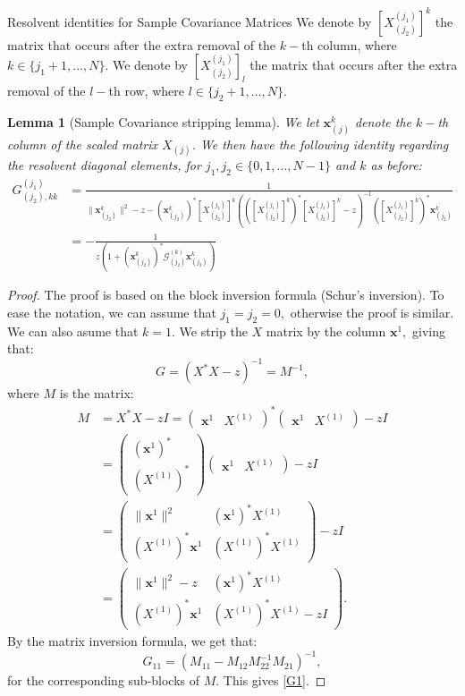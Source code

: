 \documentclass[11pt, a4paper, oneside]{book}
\numberwithin{equation}{chapter}
\newcommand{\x}{\mathbf{x}}
\newtheorem{lem}[thm]{Lemma}
\begin{document}
\begin{section}{Resolvent identities for Sample Covariance Matrices}
We denote by $[X_{(j_2)}^{(j_1)}]^k$ the matrix that occurs after the extra removal of the $k-$th column, where $k \in \{j_1+1,...,N\}.$ We denote by $[X_{(j_2)}^{(j_1)}]_l$ the matrix that occurs after the extra removal of the $l-$th row, where $l \in \{j_2+1,...,N\}.$
%
\begin{lem}[Sample Covariance stripping lemma] We let $\mathbf{x}_{(j)}^k$ denote the $k-$th column of the scaled matrix $X_{(j)}$. We then have the following identity regarding the resolvent diagonal elements, for $j_1,j_2 \in \{0,1,...,N-1\}$ and $k$ as before:
    \begin{align}
G_{(j_2), kk}^{(j_1)} &= \frac{1}{\| \x_{(j_2)}^k \|^2 - z - (\x_{(j_2)}^k)^*[X_{(j_2)}^{(j_1)}]^k\left(([X_{(j_2)}^{(j_1)}]^k)^*[X_{(j_2)}^{(j_1)}]^k - z \right)^{-1}([X_{(j_2)}^{(j_1)}]^k)^*\x_{(j_2)}^k} \label{G1}  \\
&= -\frac{1}{z \left(1+  (\x_{(j_2)}^k)^* \mathcal{G}_{(j_2)}^{(k)}
\x_{(j_2)}^k \right)} \label{G2}
    \end{align}
\end{lem}
%
\begin{proof}
    The proof is based on the block inversion formula (Schur's inversion). To ease the notation, we can assume that $j_1=j_2=0,$ otherwise the proof is similar. We can also asume that $k=1$. We strip the $X$ matrix by the column $\x^1,$ giving that:
    \[
    G = ( X^* X - z)^{-1} = M^{-1},
    \]
    where $M$ is the matrix:
    \begin{align*}
        M &= X^*X - zI = \begin{pmatrix}
        \x^1 & X^{(1)}
        \end{pmatrix}^*
        \begin{pmatrix}
         \x^1 & X^{(1)}
        \end{pmatrix} - zI \\
        &= \begin{pmatrix}
            (\x^1)^* \\
            (X^{(1)})^*
        \end{pmatrix}
        \begin{pmatrix}
         \x^1 & X^{(1)}
        \end{pmatrix} - zI \\
        &= \begin{pmatrix}
            \|\x^1\|^2 & (\x^1)^* X^{(1)} \\
            (X^{(1)})^* \x^1 & (X^{(1)})^* X^{(1)}
        \end{pmatrix} - zI \\
        &= \begin{pmatrix}
            \|\x^1\|^2 - z & (\x^1)^* X^{(1)} \\
            (X^{(1)})^* \x^1 & (X^{(1)})^* X^{(1)} - zI
        \end{pmatrix}.
    \end{align*}
    By the matrix inversion formula, we get that:
    \[
    G_{11} = ( M_{11} - M_{12} M_{22}^{-1} M_{21} )^{-1},
    \]
    for the corresponding sub-blocks of $M.$ This gives \eqref{G1}. 
    

\end{proof}
\end{section}
\end{document}
